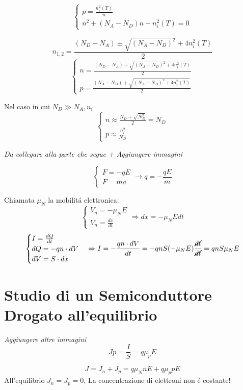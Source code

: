\documentclass{article}
\begin{document}
\[
    \begin{cases}
        p = \frac{n_i^2(T)}{n}\\
        n^2 + (N_A - N_D) n - n_i^2(T) = 0
    \end{cases}
\]

\[
    n_{1,2} = \frac{(N_D - N_A) \pm \sqrt{{(N_A - N_D)}^2} + 4n_i^2(T)}{2}
\]
\[
    \begin{cases}
        n= \frac{(N_D - N_A) + \sqrt{{(N_A - N_D)}^2 + 4n_i^2(T)}}{2}\\
        p= \frac{(N_A - N_D) + \sqrt{{(N_A - N_D)}^2 + 4n_i^2(T)}}{2}
    \end{cases}
\]

Nel caso in cui $N_D \gg N_A, n_i$
\[
    \begin{cases}
        n \approx \frac{N_D + \sqrt{N_D^2}}{2} = N_D\\
        p \approx \frac{n_i^2}{N_D}
    \end{cases}
\]

\textit{Da collegare alla parte che segue + Aggiungere immagini}

\[
    \begin{cases}
        F = -qE\\
        F = ma
    \end{cases} \rightarrow q = -\frac{qE}{m}
\]

Chiamata $\mu_N$ la mobilit\'a elettronica:
\[
    \begin{cases}
        V_n = -\mu_N E\\
        V_n = \frac{dx}{dt}
    \end{cases} \Rightarrow dx = -\mu_N E dt
\]
\[
    \begin{cases}
        I = \frac{dQ}{dt} \\
        dQ = -qn\cdot dV\\
        dV = S\cdot dx
    \end{cases} \Rightarrow I = -\frac{qn\cdot dV}{dt} = -qnS(-\mu_N E) \frac{\cancel{dt}}{\cancel{dt}} = qnS\mu_N E
\]

\section{Studio di un Semiconduttore Drogato all'equilibrio}
\textit{Aggiungere altre immagini}
\[ Jp = \frac{I}{S} = q\mu_p E \]


\[ J = J_n + J_p = q\mu_N n E + q \mu_p p E\]
All'equilibrio $J_n = J_p = 0$, La concentrazione di elettroni non \'e costante!
\end{document}
